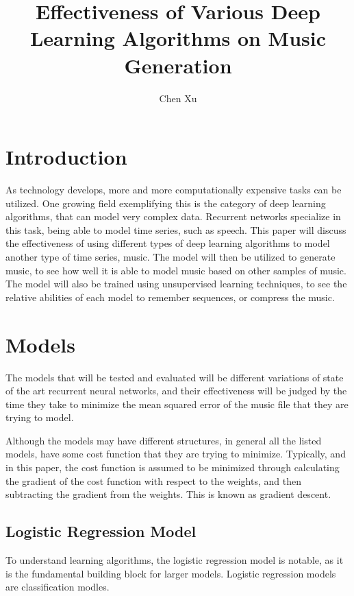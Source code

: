 \documentclass{article}
\begin{document}
\author{Chen Xu}
\title{Effectiveness of Various Deep Learning Algorithms on Music Generation}
\maketitle

\section{Introduction}
As technology develops, more and more computationally expensive tasks can be
utilized. One growing field exemplifying this is the category of deep learning
algorithms, that can model very complex data.  Recurrent networks specialize in
this task, being able to model time series, such as speech. This paper will
discuss the effectiveness of using different types of deep learning algorithms
to model another type of time series, music. The model will then be utilized to
generate music, to see how well it is able to model music based on other samples
of music. The model will also be trained using unsupervised learning techniques,
to see the relative abilities of each model to remember sequences, or compress
the music.

\section{Models}
The models that will be tested and evaluated will be different variations of
state of the art recurrent neural networks, and their effectiveness will be
judged by the time they take to minimize the mean squared error of the music
file that they are trying to model.

Although the models may have different structures, in general all the listed
models, have some cost function that they are trying to minimize. Typically, and
in this paper, the cost function is assumed to be minimized through calculating
the gradient of the cost function with respect to the weights, and then
subtracting the gradient from the weights. This is known as gradient descent.

\subsection{Logistic Regression Model}
To understand learning algorithms, the logistic regression model is notable, as
it is the fundamental building block for larger models. Logistic regression
models are classification modles.
\end{document}
